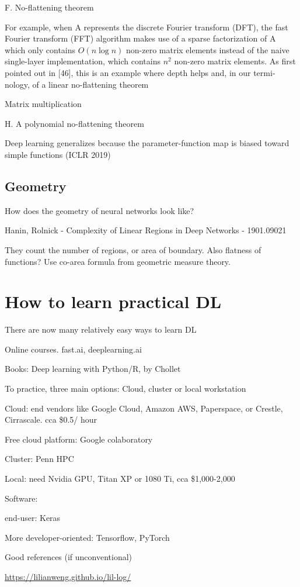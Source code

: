 \documentclass[english]{article}
\begin{document}
F. No-flattening theorem

For example, when A represents the discrete Fourier
transform (DFT), the fast Fourier transform (FFT) algorithm makes use of a sparse factorization of A which only
contains $O(n\log n)$ non-zero matrix elements instead of
the naive single-layer implementation, which contains $n^2$
non-zero matrix elements. As first pointed out in [46],
this is an example where depth helps and, in our termi-
nology, of a linear no-flattening theorem

Matrix multiplication

H. A polynomial no-flattening theorem

 
\eenum 

\item Deep learning generalizes because the parameter-function map is biased toward simple functions (ICLR 2019)


\eenum 

\subsection{Geometry}


\benum
\item How does the geometry of neural networks look like?


\item Hanin, Rolnick - Complexity of Linear Regions in Deep Networks - 1901.09021

They count the number of regions, or area of boundary. Also flatness of functions?
Use co-area formula from geometric measure theory.

\eenum 

\section{How to learn practical DL}
%
%
\bitem
\item There are now many relatively easy ways to learn DL
\bitem

\item Online courses. fast.ai, deeplearning.ai
\item Books: Deep learning with Python/R, by Chollet 
\eitem

\item To practice, three main options: Cloud, cluster or local workstation
\bitem
\item Cloud: end vendors like Google Cloud, Amazon AWS, Paperspace, or Crestle, Cirrascale. cca \$0.5/ hour
\item Free cloud platform: Google colaboratory
\item Cluster: Penn HPC
\item Local: need Nvidia GPU, Titan XP or 1080 Ti, cca \$1,000-2,000

\eitem
\item Software: 
\bitem
\item end-user: Keras
\item More developer-oriented: Tensorflow, PyTorch
\eitem

\item Good references (if unconventional)

\url{https://lilianweng.github.io/lil-log/}


\eitem
\end{document}
